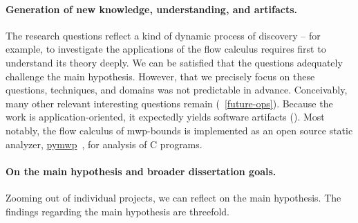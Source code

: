 \paragraph*{Generation of new knowledge, understanding, and artifacts.}
The research questions reflect a kind of dynamic process of discovery --
for example, to investigate the applications of the flow calculus requires first to understand its theory deeply.
We can be satisfied that the questions adequately challenge the main hypothesis.
However, that we precisely focus on these questions, techniques, and domains was not predictable in advance.
Conceivably, many other relevant interesting questions remain (\cf~\autoref{future-ops}).
Because the work is application-oriented, it expectedly yields software artifacts ().
Most notably, the flow calculus of mwp-bounds is implemented as an open source static analyzer,
\href{https://statycc.github.io/pymwp}{pymwp}~\cite{aubert2023b}, for analysis of C programs.

\paragraph*{On the main hypothesis and broader dissertation goals.}
Zooming out of individual projects, we can reflect on the main hypothesis.
The findings regarding the main hypothesis are threefold.

